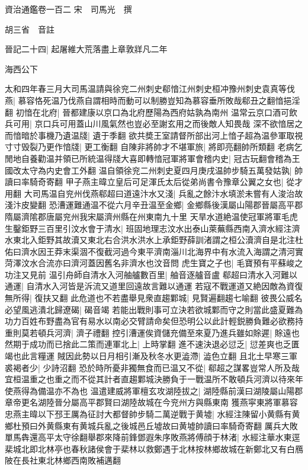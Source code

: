資治通鑑卷一百二
宋　司馬光　撰

胡三省　音註

晉記二十四|{
	起屠維大荒落盡上章敦牂凡二年}


海西公下

太和四年春三月大司馬温請與徐兖二州刺史郗愔江州刺史桓冲豫州刺史袁真等伐燕|{
	慕容恪死温乃伐燕自謂相時而動可以制勝豈知為慕容垂所敗哉郗丑之翻愔挹淫翻}
初愔在北府|{
	晉都建康以京口為北府歷陽為西府姑孰為南州}
温常云京口酒可飲兵可用|{
	京口兵可用蓋山川風氣然也豈必至謝玄用之而後敵人知畏哉}
深不欲愔居之而愔暗於事機乃遺温牋|{
	遺于季翻}
欲共奬王室請督所部出河上愔子超為温參軍取視寸寸毁裂乃更作愔牋|{
	更工衡翻}
自陳非將帥才不堪軍旅|{
	將即亮翻帥所類翻}
老病乞閒地自養勸温并領已所統温得牋大喜即轉愔冠軍將軍會稽内史|{
	冠古玩翻會稽為王國改太守為内史會工外翻}
温自領徐兖二州刺史夏四月庚戌温帥步騎五萬發姑孰|{
	帥讀曰率騎奇寄翻}
甲子燕主暐立皇后可足渾氏太后從弟尚書令豫章公翼之女也|{
	從才用翻}
大司馬温自兖州伐燕郗超曰道遠汴水又淺|{
	兵亂之餘汴水填淤未嘗有人浚治故淺汴皮變翻}
恐漕運難通温不從六月辛丑温至金鄉|{
	金鄉縣後漢屬山陽郡晉屬高平郡隋屬濟隂郡唐屬兖州我宋屬濟州縣在州東南九十里}
天旱水道絶温使冠軍將軍毛虎生鑿鉅野三百里引汶水會于清水|{
	班固地理志汶水出泰山萊蕪縣西南入濟水經注濟水東北入鉅野其故瀆又東北右合洪水洪水上承鉅野薛訓渚謂之桓公瀆濟自是北注杜佑曰濟水因王莽末渠涸不復截河過今東平濟南淄川北海界中有水流入海謂之清河實菏澤汶水合流亦曰濟河蓋因舊名非濟水也汶音問}
虎生寶之子也|{
	毛寶預有平蘇峻之功注又見前}
温引舟師自清水入河舳艫數百里|{
	舳音逐艫音盧}
郗超曰清水入河難以通運|{
	自清水入河皆是泝流又道里回遠故言難以通運}
若寇不戰運道又絶因敵為資復無所得|{
	復扶又翻}
此危道也不若盡舉見衆直趨鄴城|{
	見賢遍翻趨七喻翻}
彼畏公威名必望風逃潰北歸遼碣|{
	碣音竭}
若能出戰則事可立決若欲城鄴而守之則當此盛夏難為功力百姓布野盡為官有易水以南必交臂請命矣但恐明公以此計輕鋭勝負難必欲務持重則莫若頓兵河濟|{
	濟子禮翻}
控引漕運俟資儲充備至來夏乃進兵雖如賖遲|{
	賖遠也}
然期于成功而已捨此二策而連軍北上|{
	上時掌翻}
進不速決退必愆乏|{
	愆差爽也乏匱竭也此言糧運}
賊因此勢以日月相引漸及秋冬水更澁滯|{
	澁色立翻}
且北土早寒三軍裘褐者少|{
	少詩沼翻}
恐於時所憂非獨無食而已温又不從|{
	郗超之謀畧豈常人所及哉宜桓温重之也重之而不從其計者直趨鄴城決勝負于一戰温所不敢頓兵河濟以待來年使燕得為備温亦不為也}
温遣建威將軍檀玄攻湖陸拔之|{
	湖陸縣前漢曰湖陵屬山陽郡章帝更名湖陸晉分屬高平郡賢曰湖陸故城在今兖州方與縣東南}
獲燕寜東將軍慕容忠燕主暐以下邳王厲為征討大都督帥步騎二萬逆戰于黄墟|{
	水經注陳留小黄縣有黄鄉杜預曰外黄縣東有黄城兵亂之後城邑丘墟故曰黄墟帥讀曰率騎奇寄翻}
厲兵大敗單馬犇還高平太守徐翻舉郡來降前鋒鄧遐朱序敗燕將傅顔于林渚|{
	水經注華水東逕棐城北即北林亭也春秋諸侯會于棐林以救鄭遇于北林按林鄉故城在新鄭北又有白鴈陂在長社東北林鄉西南敗補邁翻}

